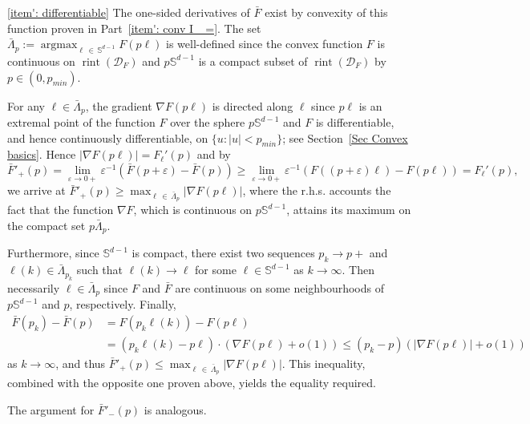 \documentclass[AHL,Unicode,published]{cedram}
\DeclareMathOperator{\rint}{rint}
\newcommand{\Sbb}{\mathbb{S}}
\newcommand{\Dcl}{\mathcal{D}}
\newcommand{\argmax}{\mathop{\mathrm{argmax}}\nolimits}
\begin{document}
\begin{proofc}
\eqref{item': differentiable} The one-sided derivatives of $\bar F$ exist by convexity of this function proven in Part~\eqref{item': conv I_ =}. The set $\bar{\Lambda}_p:= \argmax_{\ell\,\in\,\Sbb^{d-1}} F(p \ell)$ is well-defined since the convex function $F$ is continuous on $\rint(\Dcl_F) $ and $p \Sbb^{d-1} $ is a compact subset of $\rint(\Dcl_F) $ by $p \in (0, p_{min})$.

For any $\ell \in \bar{\Lambda}_p$, the gradient $\nabla F(p \ell)$ is directed along $\ell$ since $p \ell$ is an extremal point of the function $F$ over the sphere $p \Sbb^{d-1}$ and $F$ is differentiable, and hence continuously differentiable, on $\{u: |u|<p_{min}\}$; see Section~\ref{Sec Convex basics}. Hence $|\nabla F(p \ell)| = F_\ell'(p)$ and by
\[
\bar F'_+(p) = \lim_{\varepsilon\to 0+} \varepsilon^{-1}(\bar F(p+\varepsilon)- \bar F(p)) \ge \lim_{\varepsilon\to 0+} \varepsilon^{-1}(F((p+\varepsilon)\ell)- F(p\ell)) = F_\ell'(p),
\]
we arrive at $\bar F'_+(p) \ge \max_{\ell\,\in\,\bar{\Lambda}_p} |\nabla F(p \ell)|$, where the r.h.s. accounts the fact that the function $\nabla F$, which is continuous on $p \Sbb^{d-1}$, attains its maximum on the compact set $p \bar{\Lambda}_p$.

Furthermore, since $\Sbb^{d-1}$ is compact, there exist two sequences $p_k \to p+$ and $\ell(k) \in \bar{\Lambda}_{p_k}$ such that $\ell(k) \to \ell$ for some $\ell \in \Sbb^{d-1}$ as $k \to \infty$. Then necessarily $\ell \in \bar{\Lambda}_p$ since $F$ and $\bar F$ are continuous on some neighbourhoods of $p \Sbb^{d-1}$ and $p$, respectively. Finally,
\begin{align*}
\bar F(p_k) - \bar F(p) &= F(p_k \ell(k)) - F(p \ell) \\
&= \left(p_k \ell(k) - p \ell\right) \cdot \left(\nabla F(p \ell) + o(1)\right) \le (p_k - p) \left(\left|\nabla F(p\ell)\right| + o(1)\right)
\end{align*}
as $k \to \infty$, and thus $\bar F'_+(p) \le \max_{\ell\,\in \,\bar{\Lambda}_p} |\nabla F(p \ell)|$. This inequality, combined with the opposite one proven above, yields the equality required.

The argument for $\bar F'_-(p)$ is analogous.


\end{proofc}
\end{document}
